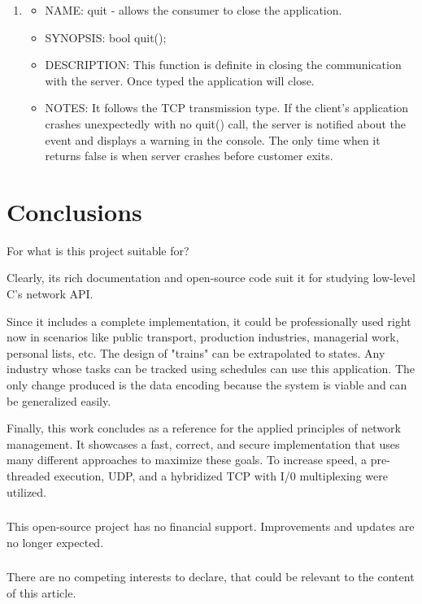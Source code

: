 \documentclass[runningheads]{llncs}
\begin{document}
\begin{enumerate}
  \item \begin{itemize}
    \item NAME: quit - allows the consumer to close the application.
    \item SYNOPSIS: bool quit();  
    \item DESCRIPTION: This function is definite in closing the communication with the server. Once typed the application will close.
    \item NOTES: It follows the TCP transmission type. If the client's application crashes unexpectedly with no quit() call, the server is notified about the event and displays a warning in the console. The only time when it returns false is when server crashes before customer exits.
  \end{itemize}
\end{enumerate}


\newpage
\section{Conclusions}

For what is this project suitable for?

Clearly, its rich documentation and open-source code suit it for studying low-level C's network API. 

Since it includes a complete implementation, it could be professionally used right now in scenarios like public transport, production industries, managerial work, personal lists, etc. The design of "trains" can be extrapolated to states. Any industry whose tasks can be tracked using schedules can use this application. The only change produced is the data encoding because the system is viable and can be generalized easily.

Finally, this work concludes as a reference for the applied principles of network management. It showcases a fast, correct, and secure implementation that uses many different approaches to maximize these goals. To increase speed, a pre-threaded execution, UDP, and a hybridized TCP with I/0 multiplexing were utilized.

\begin{credits}
  \subsubsection{\ackname} This open-source project has no financial support. Improvements and updates are no longer expected.
  \subsubsection{\discintname} There are no competing interests to declare, that could be relevant to the content of this article.
\end{credits}
    
\end{document}
